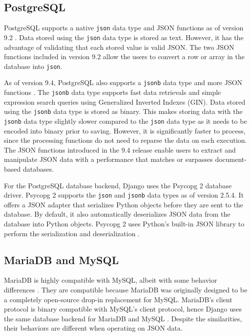 \subsection{PostgreSQL}

PostgreSQL supports a native \verb|json| data type and JSON functions as of
version 9.2 \cite{postgresql:9.2}. Data stored using the \verb|json| data type
is stored as text. However, it has the advantage of validating that each stored
value is valid JSON. The two JSON functions included in version 9.2 allow the
users to convert a row or array in the database into \verb|json|.

As of version 9.4, PostgreSQL also supports a \verb|jsonb| data type and more
JSON functions \cite{postgresql:9.4}. The \verb|jsonb| data type supports fast
data retrievals and simple expression search queries using Generalized Inverted
Indexes (GIN). Data stored using the \verb|jsonb| data type is stored as
binary. This makes storing data with the \verb|jsonb| data type slightly slower
compared to the \verb|json| data type as it needs to be encoded into binary
prior to saving. However, it is significantly faster to process, since the
processing functions do not need to reparse the data on each execution. The
JSON functions introduced in the 9.4 release enable users to extract and
manipulate JSON data with a performance that matches or surpasses
document-based databases.

For the PostgreSQL database backend, Django uses the Psycopg 2 database driver.
Psycopg 2 supports the \verb|json| and \verb|jsonb| data types as of version
2.5.4. It offers a JSON adapter that serializes Python objects before they are
sent to the database. By default, it also automatically deserializes JSON data
from the database into Python objects. Psycopg 2 uses Python's built-in JSON
library to perform the serialization and deserialization
\cite{psycopg2:json-adaptation}.

\subsection{MariaDB and MySQL}

MariaDB is highly compatible with MySQL, albeit with some behavior differences
\cite{mariadb:compatibility}. They are compatible because MariaDB was
originally designed to be a completely open-source drop-in replacement for
MySQL. MariaDB's client protocol is binary compatible with MySQL's client
protocol, hence Django uses the same database backend for MariaDB and MySQL
\cite{django:databases}. Despite the similarities, their behaviors are
different when operating on JSON data.

